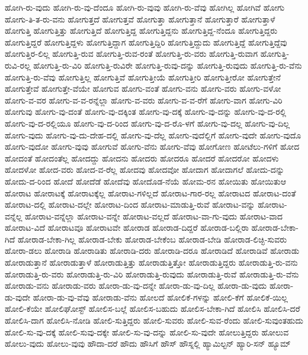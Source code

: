 {ಹೋಗಿ-ರು-ವುದು
ಹೋಗಿ-ರು-ವು-ದೆಂದೂ
ಹೋಗಿ-ರು-ವುವು
ಹೋಗಿ-ರು-ವೆವು
ಹೋಗಿಲ್ಲ
ಹೋಗಿವೆ
ಹೋಗು
ಹೋಗು-ತಿ-ತ-ರು-ವನು
ಹೋಗುತ್ತದೆ
ಹೋಗುತ್ತವೆ
ಹೋಗುತ್ತಾ
ಹೋಗುತ್ತಾನೆ
ಹೋಗುತ್ತಾರೆ
ಹೋಗುತ್ತಾಳೆ
ಹೋಗುತ್ತಿ
ಹೋಗುತ್ತಿತ್ತು
ಹೋಗುತ್ತಿದೆ
ಹೋಗುತ್ತಿದ್ದ
ಹೋಗುತ್ತಿದ್ದನು
ಹೋಗುತ್ತಿದ್ದ-ನೆಂದೂ
ಹೋಗುತ್ತಿದ್ದರು
ಹೋಗುತ್ತಿದ್ದರೆ
ಹೋಗುತ್ತಿದ್ದಳು
ಹೋಗುತ್ತಿದ್ದಾಗ
ಹೋಗುತ್ತಿದ್ದಿರಿ
ಹೋಗುತ್ತಿದ್ದುದು
ಹೋಗುತ್ತಿದ್ದೆ
ಹೋಗುತ್ತಿದ್ದೆವು
ಹೋಗುತ್ತಿರ-ಲಿಲ್ಲ
ಹೋಗುತ್ತಿ-ರುವ
ಹೋಗುತ್ತಿ-ರುವ-ರಂತೆ
ಹೋಗುತ್ತಿ-ರು-ವರು
ಹೋಗುತ್ತಿ-ರುವಾಗ
ಹೋಗುತ್ತಿ-ರುವಿ-ರಲ್ಲ
ಹೋಗುತ್ತಿ-ರು-ವಿರಿ
ಹೋಗುತ್ತಿ-ರುವಿರೇ
ಹೋಗುತ್ತಿ-ರುವು-ದನ್ನು
ಹೋಗುತ್ತಿ-ರುವುದು
ಹೋಗುತ್ತಿ-ರು-ವೆನು
ಹೋಗುತ್ತಿ-ರು-ವೆವು
ಹೋಗುತ್ತಿಲ್ಲ
ಹೋಗುತ್ತಿವೆ
ಹೋಗುತ್ತೀಯೆ
ಹೋಗುತ್ತೀರಿ
ಹೋಗುತ್ತೀರೋ
ಹೋಗುತ್ತೇನೆ
ಹೋಗುತ್ತೇವೆ
ಹೋಗುತ್ತೇ-ವೆಯೇ
ಹೋಗುವ
ಹೋಗು-ವಂತೆ
ಹೋಗು-ವನು
ಹೋಗು-ವರು
ಹೋಗು-ವಳೋ
ಹೋಗು-ವ-ವರ
ಹೋಗು-ವ-ವ-ರನ್ನೆಲ್ಲಾ
ಹೋಗು-ವ-ವರು
ಹೋಗು-ವ-ವ-ರೆಗೆ
ಹೋಗು-ವಾಗ
ಹೋಗು-ವಿರಿ
ಹೋಗುವು
ಹೋಗು-ವು-ದಂತೆ
ಹೋಗು-ವು-ದಕ್ಕಿಂತ
ಹೋಗು-ವು-ದಕ್ಕೆ
ಹೋಗು-ವು-ದನ್ನು
ಹೋಗು-ವು-ದ-ರಲ್ಲಿ
ಹೋಗು-ವು-ದ-ರಲ್ಲಿಯೂ
ಹೋಗು-ವು-ದ-ರಿಂದ
ಹೋಗು-ವು-ದ-ರೊ-ಳಗೆ
ಹೋಗು-ವು-ದಲ್ಲ
ಹೋಗು-ವು-ದಿಲ್ಲ
ಹೋಗು-ವುದು
ಹೋಗು-ವು-ದು-ದೇಹ-ದಲ್ಲಿ
ಹೋಗು-ವು-ದೆಲ್ಲ
ಹೋಗು-ವುದೆಲ್ಲಿಗೆ
ಹೋಗು-ವುದೇ
ಹೋಗು-ವುದೊ
ಹೋಗು-ವುದೋ
ಹೋಗು-ವುವು
ಹೋಗುವೆ
ಹೋಗು-ವೆನು
ಹೋಗು-ವೆವು
ಹೋಗೋಣ
ಹೋಟೆಲು-ಗಳಿಗೆ
ಹೋದ
ಹೋದಂತೆ
ಹೋದಂತೆಲ್ಲ
ಹೋದದ್ದು
ಹೋದನು
ಹೋದರು
ಹೋದರೂ
ಹೋದರೆ
ಹೋದರೋ
ಹೋದಳು
ಹೋದಳೋ
ಹೋದ-ವರು
ಹೋದ-ವ-ರೆಲ್ಲ
ಹೋದವು
ಹೋದವೋ
ಹೋದಾಗ
ಹೋದಾಗಲೆ
ಹೋದು-ದನ್ನು
ಹೋದು-ದ-ರಿಂದ
ಹೋದೆ
ಹೋದೆಡೆ
ಹೋದೆವು
ಹೋದೊಡ-ನೆಯೆ
ಹೋಮ-ರನ
ಹೋಯಿತು
ಹೋಯಿತುಆ
ಹೋರಾಟ
ಹೋರಾಟಕ್ಕೆ
ಹೋರಾಟಕ್ಕೆಲ್ಲ
ಹೋರಾಟ-ಗಳಿಲ್ಲದೆ
ಹೋರಾಟ-ಗಾರ-ರಲ್ಲ
ಹೋರಾಟದ
ಹೋರಾಟ-ದಂತೆ
ಹೋರಾಟ-ದಲ್ಲಿ
ಹೋರಾಟ-ದಲ್ಲೇ
ಹೋರಾಟ-ದಿಂದ
ಹೋರಾಟ-ಮಾಡುತ್ತಿ-ರುವೆ
ಹೋರಾಟ-ವನ್ನು
ಹೋರಾಟ-ವನ್ನೆಲ್ಲ
ಹೋರಾಟ-ವನ್ನೆಲ್ಲಾ
ಹೋರಾಟ-ವನ್ನೇ
ಹೋರಾಟ-ವಲ್ಲದೆ
ಹೋರಾಟ-ವಾ-ಗು-ವುದು
ಹೋರಾಟ-ವಾದ
ಹೋರಾಟ-ವಿದೆ
ಹೋರಾಟವೂ
ಹೋರಾಟವೇ
ಹೋರಾಡ
ಹೋರಾಡ-ದಿದ್ದರೆ
ಹೋರಾಡ-ಬಲ್ಲಿರಾ
ಹೋರಾಡ-ಬೇಕಾ-ಗಿದೆ
ಹೋರಾಡ-ಬೇಕಾ-ಗಿಲ್ಲ
ಹೋರಾಡ-ಬೇಕು
ಹೋರಾಡ-ಬೇಕೆಂಬ
ಹೋರಾಡ-ಬೇಡಿ
ಹೋರಾಡ-ಲಿಚ್ಛಿ-ಸುವರು
ಹೋರಾ-ಡಲು
ಹೋರಾಡಿ
ಹೋರಾಡಿತು
ಹೋರಾಡಿ-ದರು
ಹೋರಾಡಿ-ದರೂ
ಹೋರಾಡಿದೆ
ಹೋರಾಡಿವೆ
ಹೋರಾಡು
ಹೋರಾಡುತ್ತಾನೆ
ಹೋರಾಡುತ್ತಾಳೆ
ಹೋರಾಡುತ್ತಿತ್ತು
ಹೋರಾಡುತ್ತಿತ್ತೋ
ಹೋರಾಡುತ್ತಿದ್ದರು
ಹೋರಾಡುತ್ತಿ-ರು-ವನು
ಹೋರಾಡುತ್ತಿ-ರು-ವರು
ಹೋರಾಡುತ್ತಿ-ರು-ವಿರಿ
ಹೋರಾಡುತ್ತಿ-ರುವುದು
ಹೋರಾಡುತ್ತಿ-ರುವೆ
ಹೋರಾಡುತ್ತಿ-ರು-ವೆನು
ಹೋರಾಡು-ವನು
ಹೋರಾಡು-ವರು
ಹೋರಾ-ಡು-ವು-ದನ್ನೇ
ಹೋರಾ-ಡು-ವು-ದಿಲ್ಲ
ಹೋರಾ-ಡು-ವುದು
ಹೋರಾ-ಡು-ವುದೇ
ಹೋರಾ-ಡು-ವು-ವೆವು
ಹೋರಾಡು-ವೆನು
ಹೋಲದೆ
ಹೋಲಿಕೆ-ಗಳನ್ನು
ಹೋಲಿ-ಕೆಗೆ
ಹೋಲಿಕೆ-ಯಿಲ್ಲ
ಹೋಲಿ-ಕೆಯೇ
ಹೋಲಿಘೋಸ್ಟ್
ಹೋಲಿಸ-ಬಲ್ಲೆ
ಹೋಲಿಸ-ಬಹುದು
ಹೋಲಿಸ-ಬೇಕಾ-ಗಿದೆ
ಹೋಲಿಸಿ
ಹೋಲಿಸಿ-ದರೆ
ಹೋಲಿಸಿ-ದಾಗ
ಹೋಲಿಸಿ-ನೋಡಿ
ಹೋಲಿ-ಸುತ್ತಿದ್ದರು
ಹೋಲಿ-ಸುವರು
ಹೋಲಿ-ಸುವ-ರೆಂದು
ಹೋಲಿ-ಸುವುಂತಹುದು
ಹೋಲಿ-ಸು-ವು-ದಕ್ಕೆ
ಹೋಲಿ-ಸುವು-ದಕ್ಕೇ
ಹೋಲಿ-ಸು-ವು-ದನ್ನು
ಹೋಲಿ-ಸು-ವುದೇ
ಹೋಲುತ್ತಿದ್ದರು
ಹೋಲುವ
ಹೋಲು-ವುದು
ಹೋಲು-ವುವು
ಹೌದಾ-ದರೆ
ಹೌದು
ಹೌಸಿಗೆ
ಹೌಸ್
ಹೌಸ್ನಲ್ಲಿ
ಹ್ಯಾಮಿಲ್ಟನ್
ಹ್ಯಾರಿ-ಸನ್
ಹ್ಯೂಮ್
}
